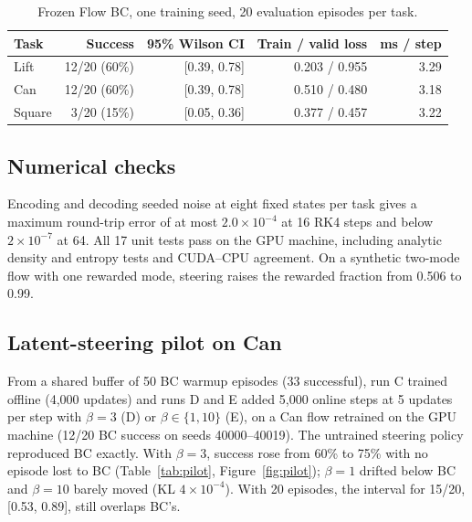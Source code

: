 \documentclass[10pt]{article}
\begin{document}
\begin{table}[t]
  \centering\small
  \caption{Frozen Flow BC, one training seed, 20 evaluation episodes per task.}
  \label{tab:bc}
  \begin{tabular}{lrrrr}
    \toprule
    Task & Success & 95\% Wilson CI & Train / valid loss & ms / step \\
    \midrule
    Lift   & 12/20 (60\%) & [0.39, 0.78] & 0.203 / 0.955 & 3.29 \\
    Can    & 12/20 (60\%) & [0.39, 0.78] & 0.510 / 0.480 & 3.18 \\
    Square &  3/20 (15\%) & [0.05, 0.36] & 0.377 / 0.457 & 3.22 \\
    \bottomrule
  \end{tabular}
\end{table}

\subsection{Numerical checks}

Encoding and decoding seeded noise at eight fixed states per task gives a
maximum round-trip error of at most $2.0\times10^{-4}$ at 16 RK4 steps and below
$2\times10^{-7}$ at 64. All 17 unit tests pass on the GPU machine, including
analytic density and entropy tests and CUDA--CPU agreement. On a synthetic
two-mode flow with one rewarded mode, steering raises the rewarded fraction from
0.506 to 0.99.

\subsection{Latent-steering pilot on Can}
\label{sec:pilot}

From a shared buffer of 50 BC warmup episodes (33 successful), run C trained
offline (4{,}000 updates) and runs D and E added 5{,}000 online steps at 5
updates per step with $\beta=3$ (D) or $\beta\in\{1,10\}$ (E), on a Can flow
retrained on the GPU machine (12/20 BC success on seeds 40000--40019). The
untrained steering policy reproduced BC exactly. With $\beta=3$, success rose
from 60\% to 75\% with no episode lost to BC (Table~\ref{tab:pilot},
Figure~\ref{fig:pilot}); $\beta=1$ drifted below BC and $\beta=10$ barely moved
(KL $4\times10^{-4}$). With 20 episodes, the interval for 15/20, [0.53, 0.89],
still overlaps BC's.
\end{document}
